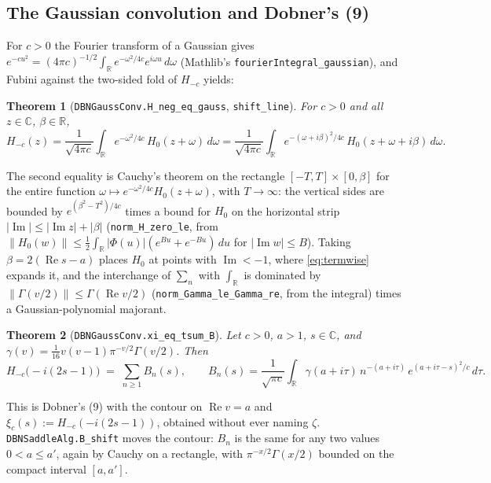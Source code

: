 \documentclass[11pt]{article}
\newtheorem{theorem}{Theorem}
\theoremstyle{definition}
\newcommand{\lean}[1]{\texttt{#1}}
\newcommand{\Hfun}{H}
\newcommand{\re}{\operatorname{Re}}
\newcommand{\im}{\operatorname{Im}}
\newcommand{\C}{\mathbb{C}}
\newcommand{\R}{\mathbb{R}}
\begin{document}
\subsection{The Gaussian convolution and Dobner's (9)}\label{sec:gauss}

For $c > 0$ the Fourier transform of a Gaussian gives $e^{-cu^2} = (4\pi c)^{-1/2}\int_\R e^{-\omega^2/4c}e^{i\omega u}\,d\omega$ (Mathlib's \lean{fourierIntegral\_gaussian}), and Fubini against the two-sided fold of $\Hfun_{-c}$ yields:

\begin{theorem}[\lean{DBNGaussConv.H\_neg\_eq\_gauss}, \lean{shift\_line}]
For $c > 0$ and all $z \in \C$, $\beta \in \R$,
\[
\Hfun_{-c}(z) = \frac{1}{\sqrt{4\pi c}}\int_\R e^{-\omega^2/4c}\,\Hfun_0(z+\omega)\,d\omega
= \frac{1}{\sqrt{4\pi c}}\int_\R e^{-(\omega + i\beta)^2/4c}\,\Hfun_0(z+\omega+i\beta)\,d\omega .
\]
\end{theorem}

The second equality is Cauchy's theorem on the rectangle $[-T, T] \times [0, \beta]$ for the entire function $\omega \mapsto e^{-\omega^2/4c}\Hfun_0(z+\omega)$, with $T \to \infty$: the vertical sides are bounded by $e^{(\beta^2 - T^2)/4c}$ times a bound for $\Hfun_0$ on the horizontal strip $|\im| \le |\im z| + |\beta|$ (\lean{norm\_H\_zero\_le}, from $\|\Hfun_0(w)\| \le \tfrac12\int_\R |\Phi(u)|(e^{Bu} + e^{-Bu})\,du$ for $|\im w| \le B$). Taking $\beta = 2(\re s - a)$ places $\Hfun_0$ at points with $\im < -1$, where \eqref{eq:termwise} expands it, and the interchange of $\sum_n$ with $\int_\R$ is dominated by $\|\Gamma(v/2)\| \le \Gamma(\re v/2)$ (\lean{norm\_Gamma\_le\_Gamma\_re}, from the integral) times a Gaussian-polynomial majorant.

\begin{theorem}[\lean{DBNGaussConv.xi\_eq\_tsum\_B}]\label{thm:eq9}
Let $c > 0$, $a > 1$, $s \in \C$, and $\gamma(v) = \tfrac1{16}v(v-1)\pi^{-v/2}\Gamma(v/2)$. Then
\[
\Hfun_{-c}\bigl(-i(2s-1)\bigr) \;=\; \sum_{n \ge 1} B_n(s),\qquad
B_n(s) = \frac{1}{\sqrt{\pi c}}\int_\R \gamma(a + i\tau)\, n^{-(a+i\tau)}\, e^{(a + i\tau - s)^2/c}\,d\tau .
\]
\end{theorem}

\noindent
This is Dobner's (9) with the contour on $\re v = a$ and $\xi_c(s) := \Hfun_{-c}(-i(2s-1))$, obtained without ever naming $\zeta$. \lean{DBNSaddleAlg.B\_shift} moves the contour: $B_n$ is the same for any two values $0 < a \le a'$, again by Cauchy on a rectangle, with $\pi^{-x/2}\Gamma(x/2)$ bounded on the compact interval $[a, a']$.
\end{document}
